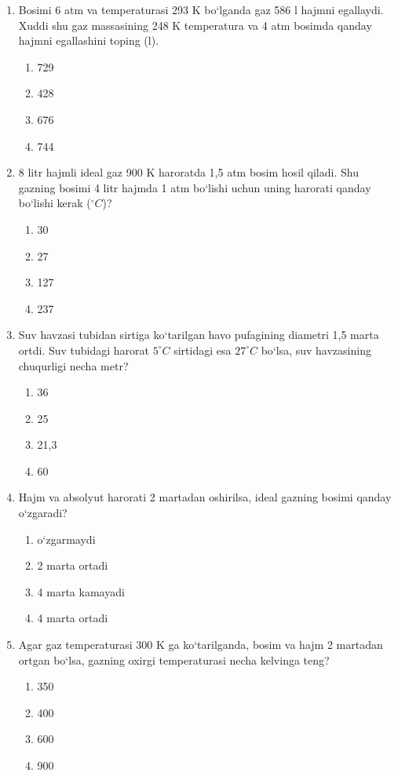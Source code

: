 \begin{enumerate}
\item Bosimi 6 atm va temperaturasi 293 K bo‘lganda gaz 586 l hajmni egallaydi. Xuddi shu gaz massasining 248 K temperatura va 4 atm bosimda qanday hajmni egallashini toping (l).
\begin{enumerate}[label=\Alph*)]
\item 729
\item 428
\item 676
\item 744
\end{enumerate}

\item 8 litr hajmli ideal gaz 900 K haroratda 1,5 atm bosim hosil qiladi. Shu gazning bosimi 4 litr hajmda 1 atm bo‘lishi uchun uning harorati qanday bo‘lishi kerak ($^\circ C$)?
\begin{enumerate}[label=\Alph*)]
\item 30
\item 27
\item 127
\item 237
\end{enumerate}

\item Suv havzasi tubidan sirtiga ko‘tarilgan havo pufagining diametri 1,5 marta ortdi. Suv tubidagi harorat $5^\circ C$ sirtidagi esa $27^\circ C$ bo‘lsa, suv havzasining chuqurligi necha metr?
\begin{enumerate}[label=\Alph*)]
\item 36
\item 25
\item 21,3
\item 60
\end{enumerate}

\item Hajm va absolyut harorati 2 martadan oshirilsa, ideal gazning bosimi qanday o‘zgaradi?
\begin{enumerate}[label=\Alph*)]
\item o‘zgarmaydi
\item 2 marta ortadi
\item 4 marta kamayadi
\item 4 marta ortadi
\end{enumerate}

\item Agar gaz temperaturasi 300 K ga ko‘tarilganda, bosim va hajm 2 martadan ortgan bo‘lsa, gazning oxirgi temperaturasi necha kelvinga teng?
\begin{enumerate}[label=\Alph*)]
\item 350
\item 400
\item 600
\item 900
\end{enumerate}


\end{enumerate}
